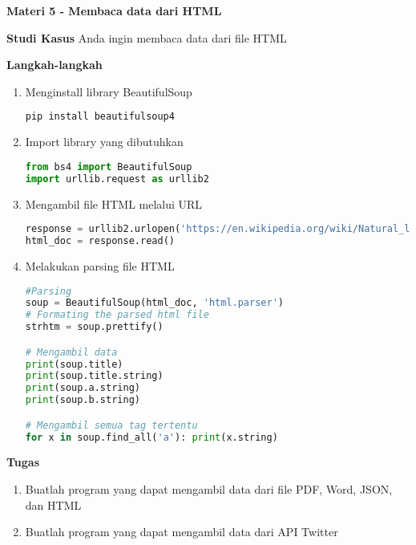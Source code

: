 \documentclass{article}
\begin{document}
    \begin{flushleft}
        \textbf{Materi 5 - Membaca data dari HTML}
        \newline

        \textbf{Studi Kasus}
        \newline
        Anda ingin membaca data dari file HTML
        \newline

        \textbf{Langkah-langkah}

        \begin{enumerate}
            \item Menginstall library BeautifulSoup
            \lstset{style=bashstyle}
            \begin{lstlisting}[language=bash]
pip install beautifulsoup4
            \end{lstlisting}

            \item Import library yang dibutuhkan
            \lstset{style=pythonstyle}
            \begin{lstlisting}[language=python]
from bs4 import BeautifulSoup   
import urllib.request as urllib2
            \end{lstlisting}

            \item Mengambil file HTML melalui URL
            \lstset{style=pythonstyle}
            \begin{lstlisting}[language=python]
response = urllib2.urlopen('https://en.wikipedia.org/wiki/Natural_language_processing')
html_doc = response.read()
            \end{lstlisting}

            \item Melakukan parsing file HTML
            \lstset{style=pythonstyle}
            \begin{lstlisting}[language=python]
#Parsing
soup = BeautifulSoup(html_doc, 'html.parser')
# Formating the parsed html file
strhtm = soup.prettify()

# Mengambil data
print(soup.title)
print(soup.title.string)
print(soup.a.string)
print(soup.b.string)

# Mengambil semua tag tertentu
for x in soup.find_all('a'): print(x.string)
            \end{lstlisting}
        \end{enumerate}
        
    \end{flushleft}

    \newpage
    \begin{flushleft}
        \textbf{Tugas}
        \newline

        \begin{enumerate}
            \item Buatlah program yang dapat mengambil data dari file PDF, Word, JSON, dan HTML
            \item Buatlah program yang dapat mengambil data dari API Twitter
        \end{enumerate}
    \end{flushleft}
\end{document}
